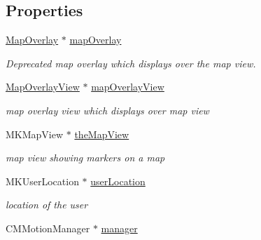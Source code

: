 \subsection*{Properties}
\begin{DoxyCompactItemize}
\item 
\hypertarget{interface_virt_tour_view_controller_afbe490a5380c3bd6187c73b1fb31ad17}{\hyperlink{interface_map_overlay}{Map\-Overlay} $\ast$ \hyperlink{interface_virt_tour_view_controller_afbe490a5380c3bd6187c73b1fb31ad17}{map\-Overlay}}\label{interface_virt_tour_view_controller_afbe490a5380c3bd6187c73b1fb31ad17}

\begin{DoxyCompactList}\small\item\em {\itshape Deprecated} map overlay which displays over the map view. \end{DoxyCompactList}\item 
\hypertarget{interface_virt_tour_view_controller_a66e3bab65bc53d7cbe5b0d95a2e79496}{\hyperlink{interface_map_overlay_view}{Map\-Overlay\-View} $\ast$ \hyperlink{interface_virt_tour_view_controller_a66e3bab65bc53d7cbe5b0d95a2e79496}{map\-Overlay\-View}}\label{interface_virt_tour_view_controller_a66e3bab65bc53d7cbe5b0d95a2e79496}

\begin{DoxyCompactList}\small\item\em map overlay view which displays over map view \end{DoxyCompactList}\item 
\hypertarget{interface_virt_tour_view_controller_ae1ffda68123f743b99a32abd98d53757}{M\-K\-Map\-View $\ast$ \hyperlink{interface_virt_tour_view_controller_ae1ffda68123f743b99a32abd98d53757}{the\-Map\-View}}\label{interface_virt_tour_view_controller_ae1ffda68123f743b99a32abd98d53757}

\begin{DoxyCompactList}\small\item\em map view showing markers on a map \end{DoxyCompactList}\item 
\hypertarget{interface_virt_tour_view_controller_a812a84a9ccdd1bd44abea380a3a347f5}{M\-K\-User\-Location $\ast$ \hyperlink{interface_virt_tour_view_controller_a812a84a9ccdd1bd44abea380a3a347f5}{user\-Location}}\label{interface_virt_tour_view_controller_a812a84a9ccdd1bd44abea380a3a347f5}

\begin{DoxyCompactList}\small\item\em location of the user \end{DoxyCompactList}\item 
\hypertarget{interface_virt_tour_view_controller_af6d209d7027ac4d30552fe9961b62b6d}{C\-M\-Motion\-Manager $\ast$ \hyperlink{interface_virt_tour_view_controller_af6d209d7027ac4d30552fe9961b62b6d}{manager}}\label{interface_virt_tour_view_controller_af6d209d7027ac4d30552fe9961b62b6d}


\end{DoxyCompactItemize}
